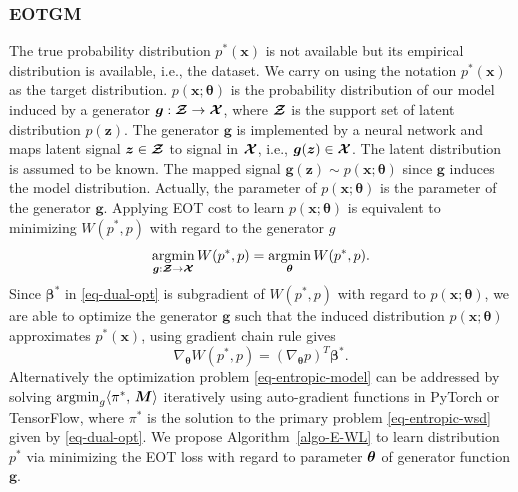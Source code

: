 \subsubsection{EOTGM}\label{subsec-gmeot}
{The true probability distribution $p^{\ast}(\bm{x})$ is not available but its empirical distribution is available, i.e., the dataset. We carry on using the notation $p^{\ast}(\bm{x})$ as the target distribution. $p(\bm{x};\bm{\theta})$ is the probability distribution of our model induced by a generator $\bm{g}: \bm{\mathcal{Z}} \rightarrow \bm{\mathcal{X}}$, where $\bm{\mathcal{Z}}$ is the support set of latent distribution $p(\bm{z})$. The generator $\bm{g}$ is implemented by a neural network and maps latent signal $\bm{z} \in \bm{\mathcal{Z}}$ to signal in $\bm{\mathcal{X}}$, i.e., $\bm{g}(\bm{z}) \in \bm{\mathcal{X}}$. The latent distribution is assumed to be known. The mapped signal $\bm{g}(\bm{z}) \sim p(\bm{x};\bm{\theta})$ since $\bm{g}$ induces the model distribution. Actually, the parameter of $p(\bm{x};\bm{\theta})$ is the parameter of the generator $\bm{g}$. Applying EOT cost to learn $p(\bm{x}; \bm{\theta})$ is equivalent to minimizing $W(p^{\ast}, p)$ with regard to the generator $g$}
\begin{equation}\label{eq-entropic-model}
  \underset{\bm{g}:\bm{\mathcal{Z}}\to \bm{\mathcal{X}}}{\operatorname{argmin}}\, W(p^{\ast}, p) = \underset{\bm{\theta}}{\operatorname{argmin}}\, W(p^{\ast}, p).
\end{equation}
Since $\bm{\beta}^{\ast}$ in \eqref{eq-dual-opt} is subgradient of $W(p^{\ast}, p)$ with regard to $p(\bm{x};\bm{\theta})$, we are able to
optimize the generator $\bm{g}$ such that the induced distribution $p(\bm{x};\bm{\theta})$ approximates $p^{\ast}(\bm{x})$, using gradient chain rule gives
\begin{equation}
  \nabla_{\bm{\theta}}W(p^{\ast}, p) = \left(\nabla_{\bm{\theta}}p\right)^{T} \bm{\beta}^{\ast}.
\end{equation}
Alternatively the optimization problem \eqref{eq-entropic-model} can be addressed by solving $\operatorname{argmin}_{g}\langle \pi^{\ast},\,\bm{M}\rangle $ iteratively using auto-gradient functions in PyTorch\cite{pytorch} or
TensorFlow\cite{tensorflow}, where $\pi^{\ast}$ is the solution to the primary problem \eqref{eq-entropic-wsd} given by \eqref{eq-dual-opt}. We
propose Algorithm~\ref{algo-E-WL} to learn distribution $p^{\ast}$
via minimizing the EOT loss with regard to parameter $\bm{\theta}$ of generator function $\bm{g}$.
